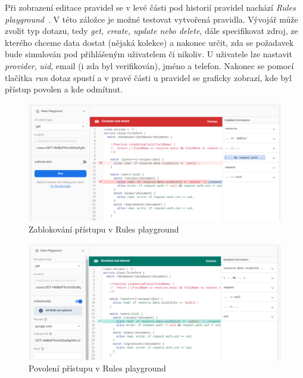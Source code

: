 Při zobrazení editace pravidel se v levé části pod historií pravidel nachází \emph{Rules playground}~\cite{FirebaseRulesPlayground}. V této záložce je možné
testovat vytvořená pravidla. Vývojář může zvolit typ dotazu, tedy \emph{get, create, update \emph{nebo} delete}, dále specifikovat
zdroj, ze kterého chceme data dostat (nějaká kolekce) a nakonec určit, zda se požadavek bude simulován pod přihlášeným uživatelem
či nikoliv. U uživatele lze nastavit \emph{provider}, \emph{uid}, email (i zda byl verifikován), jméno a telefon. Nakonec se pomocí tlačítka
\emph{run} dotaz spustí a v pravé části u pravidel se graficky zobrazí, kde byl přístup povolen a kde odmítnut.


\begin{figure}[H]
    \includegraphics[width=\textwidth]{images/recipeo-rules-denied}
    \caption{Zablokování přístupu v Rules playground} \label{picture:recipeo:rules-denied}
\end{figure}

\begin{figure}[H]
    \includegraphics[width=\textwidth]{images/recipeo-rules-allowed}
    \caption{Povolení přístupu v Rules playground} \label{picture:recipeo:rules-allowed}
\end{figure}

